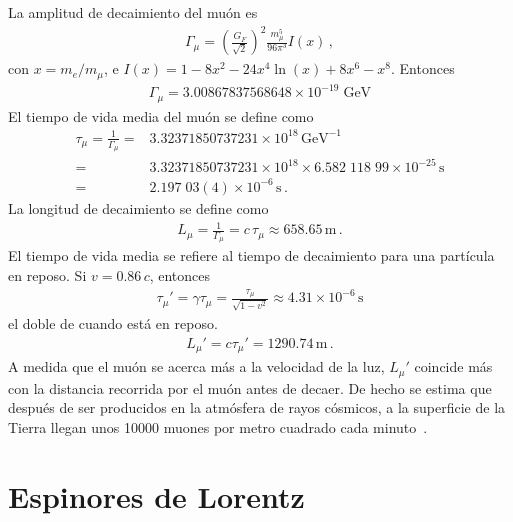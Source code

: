 \begin{frame}
\begin{example}
  La amplitud de decaimiento del muón es
    \begin{align}
      \Gamma_\mu=\left(\frac{G_F}{\sqrt{2}}\right)^2\frac{m_\mu^5}{96\pi^3}I\left(x\right)\,,
    \end{align}
    con $x=m_e/m_\mu$, e $I(x)=1-8x^2-24x^4\ln(x)+8x^6-x^8$.
    Entonces
    \begin{align}
      \Gamma_\mu=3.00867837568648 \times 10^{- 19} \; \text{GeV}
    \end{align}
    El tiempo de vida media del muón se define como
    \begin{align}
      \tau_\mu=\frac{1}{\Gamma_\mu}=&3.32371850737231\times10^{18}\,\text{GeV}^{-1}\nonumber\\
      =&3.32371850737231\times10^{18}\times6.582\;118\;99\times10^{-25}\,\text{s}\nonumber\\
      =&2.197\;03(4)\times10^{-6}\,\text{s}\,.
    \end{align}
La longitud de decaimiento se define como
\begin{align}
  L_\mu=\frac{1}{\Gamma_\mu}=c\,\tau_\mu\approx658.65\,\text{m}\,.
\end{align}
El tiempo de vida media se refiere al tiempo de decaimiento para una partícula en reposo. Si $v=0.86\,c$, entonces
\begin{align}
  \tau_\mu'=\gamma\tau_\mu=\frac{\tau_\mu}{\sqrt{1-v^2}}\approx4.31\times10^{-6}\,\text{s}
\end{align}
el doble de cuando está en reposo. 
\begin{align}
  L_\mu'=c\tau_\mu'=1290.74\,\text{m}\,.
\end{align}
A medida que el muón se acerca más a la velocidad de la luz, $L_\mu'$ coincide más con la distancia recorrida por el muón antes de decaer. De hecho se estima que después de ser producidos en la atmósfera de rayos cósmicos, a la superficie de la Tierra llegan unos 10000 muones por metro cuadrado cada minuto~\cite{muon}.

\end{example}

\end{frame}

\section{Espinores de Lorentz}



